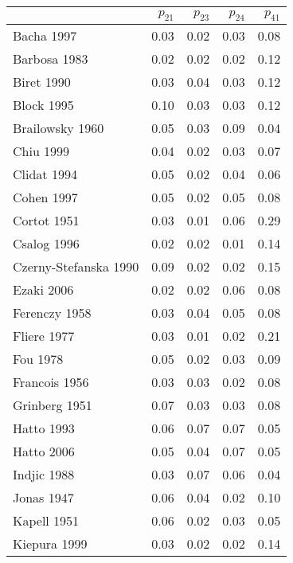\documentclass[12pt]{article}
\begin{document}
\begin{table}[H]
\centering
\begin{tabular}{lrrrr}
\toprule
  & $p_{21}$ & $p_{23}$ & $p_{24}$ & $p_{41}$\\
\midrule
\rowcolor{gray!6}  Bacha 1997 & 0.03 & 0.02 & 0.03 & 0.08\\
Barbosa 1983 & 0.02 & 0.02 & 0.02 & 0.12\\
\rowcolor{gray!6}  Biret 1990 & 0.03 & 0.04 & 0.03 & 0.12\\
Block 1995 & 0.10 & 0.03 & 0.03 & 0.12\\
\rowcolor{gray!6}  Brailowsky 1960 & 0.05 & 0.03 & 0.09 & 0.04\\
\addlinespace
Chiu 1999 & 0.04 & 0.02 & 0.03 & 0.07\\
\rowcolor{gray!6}  Clidat 1994 & 0.05 & 0.02 & 0.04 & 0.06\\
Cohen 1997 & 0.05 & 0.02 & 0.05 & 0.08\\
\rowcolor{gray!6}  Cortot 1951 & 0.03 & 0.01 & 0.06 & 0.29\\
Csalog 1996 & 0.02 & 0.02 & 0.01 & 0.14\\
\addlinespace
\rowcolor{gray!6}  Czerny-Stefanska 1990 & 0.09 & 0.02 & 0.02 & 0.15\\
Ezaki 2006 & 0.02 & 0.02 & 0.06 & 0.08\\
\rowcolor{gray!6}  Ferenczy 1958 & 0.03 & 0.04 & 0.05 & 0.08\\
Fliere 1977 & 0.03 & 0.01 & 0.02 & 0.21\\
\rowcolor{gray!6}  Fou 1978 & 0.05 & 0.02 & 0.03 & 0.09\\
\addlinespace
Francois 1956 & 0.03 & 0.03 & 0.02 & 0.08\\
\rowcolor{gray!6}  Grinberg 1951 & 0.07 & 0.03 & 0.03 & 0.08\\
Hatto 1993 & 0.06 & 0.07 & 0.07 & 0.05\\
\rowcolor{gray!6}  Hatto 2006 & 0.05 & 0.04 & 0.07 & 0.05\\
Indjic 1988 & 0.03 & 0.07 & 0.06 & 0.04\\
\addlinespace
\rowcolor{gray!6}  Jonas 1947 & 0.06 & 0.04 & 0.02 & 0.10\\
Kapell 1951 & 0.06 & 0.02 & 0.03 & 0.05\\
\rowcolor{gray!6}  Kiepura 1999 & 0.03 & 0.02 & 0.02 & 0.14\\
\bottomrule
\end{tabular}
\end{table}

\newpage
\end{document}
